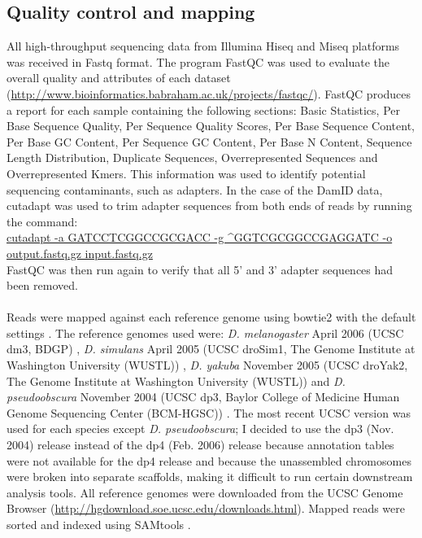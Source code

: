 \subsection{Quality control and mapping}
All high-throughput sequencing data from Illumina Hiseq and Miseq platforms was received in Fastq format. The program FastQC was used to evaluate the overall quality and attributes of each dataset (\url{http://www.bioinformatics.babraham.ac.uk/projects/fastqc/}). FastQC produces a report for each sample containing the following sections: Basic Statistics, Per Base Sequence Quality, Per Sequence Quality Scores, Per Base Sequence Content, Per Base GC Content, Per Sequence GC Content, Per Base N Content, Sequence Length Distribution, Duplicate Sequences, Overrepresented Sequences and Overrepresented Kmers. This information was used to identify potential sequencing contaminants, such as adapters. In the case of the DamID data, cutadapt was used to trim adapter sequences from both ends of reads by running the command:
\\
\url{cutadapt -a GATCCTCGGCCGCGACC -g ^GGTCGCGGCCGAGGATC -o output.fastq.gz input.fastq.gz}
\\
FastQC was then run again to verify that all 5’ and 3’ adapter sequences had been removed. 
\paragraph{}
Reads were mapped against each reference genome using bowtie2 with the default settings \citep{langmead_fast_2012}. The reference genomes used were: \emph{D. melanogaster} April 2006 (UCSC dm3, BDGP) \citep{adams_genome_2000, celniker_finishing_2002}, \emph{D. simulans} April 2005 (UCSC droSim1, The Genome Institute at Washington University (WUSTL)) \citep{clark_evolution_2007}, \emph{D. yakuba} November 2005 (UCSC droYak2, The Genome Institute at Washington University (WUSTL)) \citep{clark_evolution_2007} and \emph{D. pseudoobscura} November 2004 (UCSC dp3, Baylor College of Medicine Human Genome Sequencing Center (BCM-HGSC)) \citep{clark_evolution_2007, richards_comparative_2005}. The most recent UCSC version was used for each species except \emph{D. pseudoobscura}; I decided to use the dp3 (Nov. 2004) release instead of the dp4 (Feb. 2006) release because annotation tables were not available for the dp4 release and because the unassembled chromosomes were broken into separate scaffolds, making it difficult to run certain downstream analysis tools. All reference genomes were downloaded from the UCSC Genome Browser (\url{http://hgdownload.soe.ucsc.edu/downloads.html}). Mapped reads were sorted and indexed using SAMtools \citep{li_sequence_2009}.


